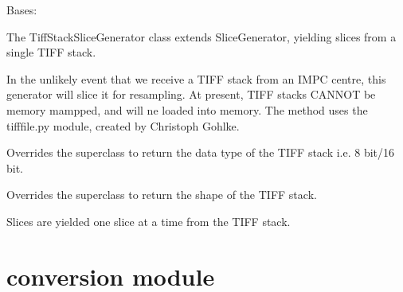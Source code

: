 \documentclass[letterpaper,10pt,english]{sphinxmanual}
\begin{document}
\begin{fulllineitems}
\label{SliceGenerator:SliceGenerator.TiffStackSliceGenerator}
Bases: {\hyperref[SliceGenerator:SliceGenerator.SliceGenerator]{}}

The TiffStackSliceGenerator class extends SliceGenerator, yielding slices from a single TIFF stack.

In the unlikely event that we receive a TIFF stack from an IMPC centre, this generator will slice it for resampling.
At present, TIFF stacks CANNOT be memory mampped, and will ne loaded into memory. The method uses the tifffile.py
module, created by Christoph Gohlke.

\begin{fulllineitems}
\label{SliceGenerator:SliceGenerator.TiffStackSliceGenerator.dtype}
Overrides the superclass to return the data type of the TIFF stack i.e. 8 bit/16 bit.

\end{fulllineitems}


\begin{fulllineitems}
\label{SliceGenerator:SliceGenerator.TiffStackSliceGenerator.shape}
Overrides the superclass to return the shape of the TIFF stack.

\end{fulllineitems}


\begin{fulllineitems}
\label{SliceGenerator:SliceGenerator.TiffStackSliceGenerator.slices}
Slices are yielded one slice at a time from the TIFF stack.

\end{fulllineitems}


\end{fulllineitems}



\chapter{conversion module}
\label{conversion:conversion-module}\label{conversion:module-conversion}\label{conversion::doc}
\end{document}

